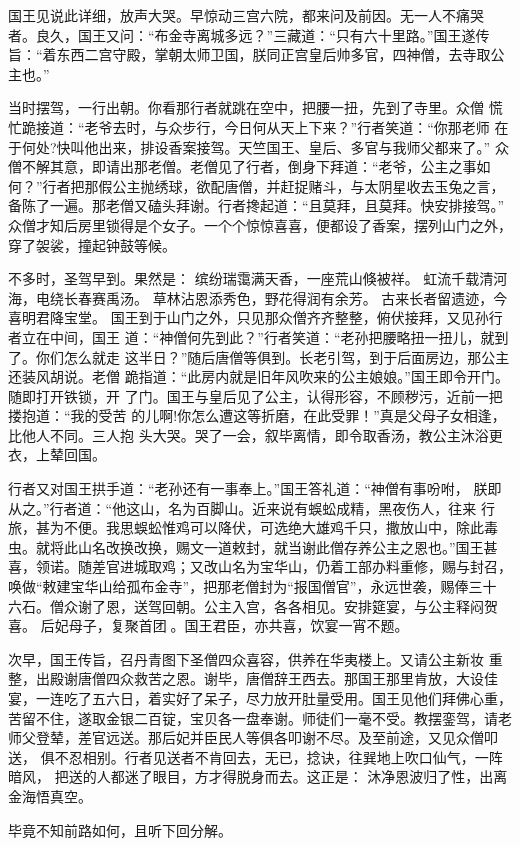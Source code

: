 国王见说此详细，放声大哭。早惊动三宫六院，都来问及前因。无一人不痛哭
者。良久，国王又问：“布金寺离城多远？”三藏道：“只有六十里路。”国王遂传
旨：“着东西二宫守殿，掌朝太师卫国，朕同正宫皇后帅多官，四神僧，去寺取公
主也。”

当时摆驾，一行出朝。你看那行者就跳在空中，把腰一扭，先到了寺里。众僧
慌忙跪接道：“老爷去时，与众步行，今日何从天上下来？”行者笑道：“你那老师
在于何处?快叫他出来，排设香案接驾。天竺国王、皇后、多官与我师父都来了。”
众僧不解其意，即请出那老僧。老僧见了行者，倒身下拜道：“老爷，公主之事如
何？”行者把那假公主抛绣球，欲配唐僧，并赶捉赌斗，与太阴星收去玉兔之言，
备陈了一遍。那老僧又磕头拜谢。行者搀起道：“且莫拜，且莫拜。快安排接驾。”
众僧才知后房里锁得是个女子。一个个惊惊喜喜，便都设了香案，摆列山门之外，
穿了袈裟，撞起钟鼓等候。

不多时，圣驾早到。果然是：
缤纷瑞霭满天香，一座荒山倏被祥。
虹流千载清河海，电绕长春赛禹汤。
草林沾恩添秀色，野花得润有余芳。
古来长者留遗迹，今喜明君降宝堂。
国王到于山门之外，只见那众僧齐齐整整，俯伏接拜，又见孙行者立在中间，国王
道：“神僧何先到此？”行者笑道：“老孙把腰略扭一扭儿，就到了。你们怎么就走
这半日？”随后唐僧等俱到。长老引驾，到于后面房边，那公主还装风胡说。老僧
跪指道：“此房内就是旧年风吹来的公主娘娘。”国王即令开门。随即打开铁锁，开
了门。国王与皇后见了公主，认得形容，不顾秽污，近前一把搂抱道：“我的受苦
的儿啊!你怎么遭这等折磨，在此受罪！”真是父母子女相逢，比他人不同。三人抱
头大哭。哭了一会，叙毕离情，即令取香汤，教公主沐浴更衣，上辇回国。

行者又对国王拱手道：“老孙还有一事奉上。”国王答礼道：“神僧有事吩咐，
朕即从之。”行者道：“他这山，名为百脚山。近来说有蜈蚣成精，黑夜伤人，往来
行旅，甚为不便。我思蜈蚣惟鸡可以降伏，可选绝大雄鸡千只，撒放山中，除此毒
虫。就将此山名改换改换，赐文一道敕封，就当谢此僧存养公主之恩也。”国王甚
喜，领诺。随差官进城取鸡；又改山名为宝华山，仍着工部办料重修，赐与封召，
唤做“敕建宝华山给孤布金寺”，把那老僧封为“报国僧官”，永远世袭，赐俸三十
六石。僧众谢了恩，送驾回朝。公主入宫，各各相见。安排筵宴，与公主释闷贺喜。
后妃母子，复聚首团。国王君臣，亦共喜，饮宴一宵不题。

次早，国王传旨，召丹青图下圣僧四众喜容，供养在华夷楼上。又请公主新妆
重整，出殿谢唐僧四众救苦之恩。谢毕，唐僧辞王西去。那国王那里肯放，大设佳
宴，一连吃了五六日，着实好了呆子，尽力放开肚量受用。国王见他们拜佛心重，
苦留不住，遂取金银二百锭，宝贝各一盘奉谢。师徒们一毫不受。教摆銮驾，请老
师父登辇，差官远送。那后妃并臣民人等俱各叩谢不尽。及至前途，又见众僧叩送，
俱不忍相别。行者见送者不肯回去，无已，捻诀，往巽地上吹口仙气，一阵暗风，
把送的人都迷了眼目，方才得脱身而去。这正是：
沐净恩波归了性，出离金海悟真空。

毕竟不知前路如何，且听下回分解。